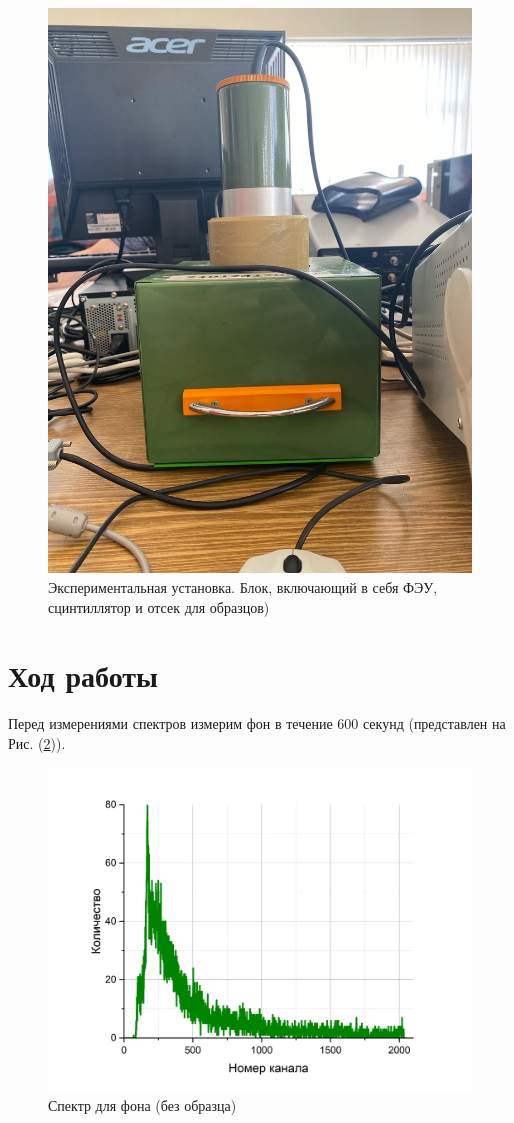 \documentclass[a4paper,12pt]{article}
\begin{document}
\begin{figure}[h!]
	\centering
	\includegraphics[width=0.8\linewidth]{fig2}
	\caption{Экспериментальная установка. Блок, включающий в себя ФЭУ, сцинтиллятор и отсек для образцов)}
	\label{fig2:FEU}
\end{figure}

\section*{Ход работы}
Перед измерениями спектров измерим фон в течение 600 секунд 
(представлен на  \\ Рис. (\ref{graph1:background})).

\newpage 

\begin{figure}[h]
	\centering
	\includegraphics[width=0.8\linewidth]{graph8}
	\caption{Спектр для фона (без образца)}
	\label{graph1:background}
\end{figure} 
 
\end{document}
